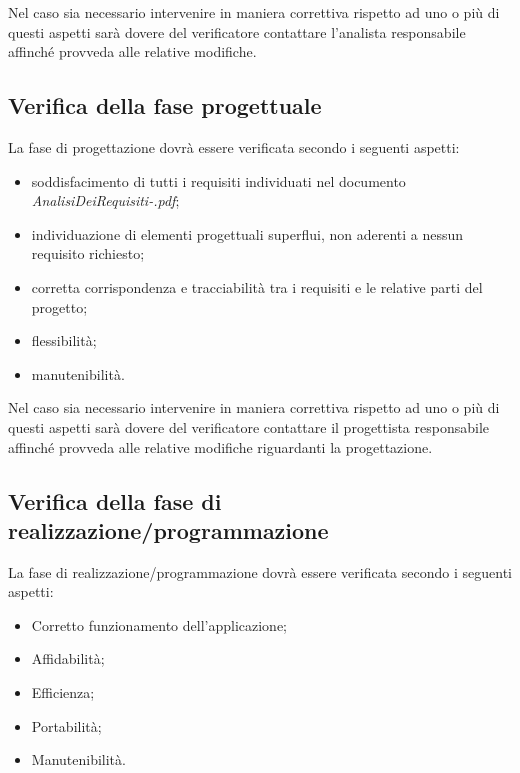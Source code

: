 Nel caso sia necessario intervenire in maniera correttiva rispetto ad uno o
pi\`u di questi aspetti sar\`a dovere del verificatore contattare l'analista
responsabile affinch\'e provveda alle relative modifiche.



\subsection{Verifica della fase progettuale}

La fase di progettazione dovr\`a essere verificata secondo i seguenti aspetti:

\begin{itemize}

\item soddisfacimento di tutti i requisiti individuati nel documento
\emph{AnalisiDeiRequisiti-\versioneAR.pdf};
\item individuazione di elementi progettuali superflui, non aderenti a nessun
requisito richiesto;
\item corretta corrispondenza e tracciabilit\`a tra i requisiti e le relative
parti del progetto;
\item flessibilit\`a;
\item manutenibilit\`a.

\end{itemize}

Nel caso sia necessario intervenire in maniera correttiva rispetto ad uno o
pi\`u di questi aspetti sar\`a dovere del verificatore contattare il progettista
responsabile affinch\'e provveda alle relative modifiche riguardanti la progettazione.

\subsection{Verifica della fase di realizzazione/programmazione}

La fase di realizzazione/programmazione dovr\`a essere verificata secondo i seguenti aspetti:
\begin{itemize}
\item Corretto funzionamento dell'applicazione;
\item Affidabilit\`a;
\item Efficienza;
\item Portabilit\`a;
\item Manutenibilit\`a.

\end{itemize}

